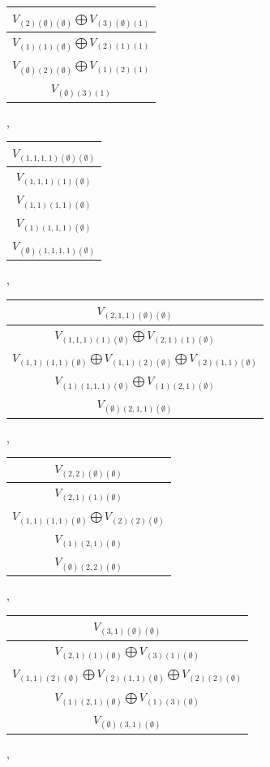 \documentclass[letterpaper,11pt]{article}
\begin{document}
	\begin{tabular}{| c |}
		\hline
		$V_{(2)(\emptyset)(\emptyset)}$$\bigoplus$$V_{(3)(\emptyset)(1)}$\\
		\hline
		$V_{(1)(1)(\emptyset)}$$\bigoplus$$V_{(2)(1)(1)}$\\
		\hline
		$V_{(\emptyset)(2)(\emptyset)}$$\bigoplus$$V_{(1)(2)(1)}$\\
		\hline
		$V_{(\emptyset)(3)(1)}$\\
		\hline
	\end{tabular}, 
	\begin{tabular}{| c |}
		\hline
		$V_{(1,1,1,1)(\emptyset)(\emptyset)}$\\
		\hline
		$V_{(1,1,1)(1)(\emptyset)}$\\
		\hline
		$V_{(1,1)(1,1)(\emptyset)}$\\
		\hline
		$V_{(1)(1,1,1)(\emptyset)}$\\
		\hline
		$V_{(\emptyset)(1,1,1,1)(\emptyset)}$\\
		\hline
	\end{tabular}, 
	\newline 
	\begin{tabular}{| c |}
		\hline
		$V_{(2,1,1)(\emptyset)(\emptyset)}$\\
		\hline
		$V_{(1,1,1)(1)(\emptyset)}$$\bigoplus$$V_{(2,1)(1)(\emptyset)}$\\
		\hline
		$V_{(1,1)(1,1)(\emptyset)}$$\bigoplus$$V_{(1,1)(2)(\emptyset)}$$\bigoplus$$V_{(2)(1,1)(\emptyset)}$\\
		\hline
		$V_{(1)(1,1,1)(\emptyset)}$$\bigoplus$$V_{(1)(2,1)(\emptyset)}$\\
		\hline
		$V_{(\emptyset)(2,1,1)(\emptyset)}$\\
		\hline
	\end{tabular}, 
	\begin{tabular}{| c |}
		\hline
		$V_{(2,2)(\emptyset)(\emptyset)}$\\
		\hline
		$V_{(2,1)(1)(\emptyset)}$\\
		\hline
		$V_{(1,1)(1,1)(\emptyset)}$$\bigoplus$$V_{(2)(2)(\emptyset)}$\\
		\hline
		$V_{(1)(2,1)(\emptyset)}$\\
		\hline
		$V_{(\emptyset)(2,2)(\emptyset)}$\\
		\hline
	\end{tabular}, 
	\newline 
	\begin{tabular}{| c |}
		\hline
		$V_{(3,1)(\emptyset)(\emptyset)}$\\
		\hline
		$V_{(2,1)(1)(\emptyset)}$$\bigoplus$$V_{(3)(1)(\emptyset)}$\\
		\hline
		$V_{(1,1)(2)(\emptyset)}$$\bigoplus$$V_{(2)(1,1)(\emptyset)}$$\bigoplus$$V_{(2)(2)(\emptyset)}$\\
		\hline
		$V_{(1)(2,1)(\emptyset)}$$\bigoplus$$V_{(1)(3)(\emptyset)}$\\
		\hline
		$V_{(\emptyset)(3,1)(\emptyset)}$\\
		\hline
	\end{tabular}, 
\end{document}
